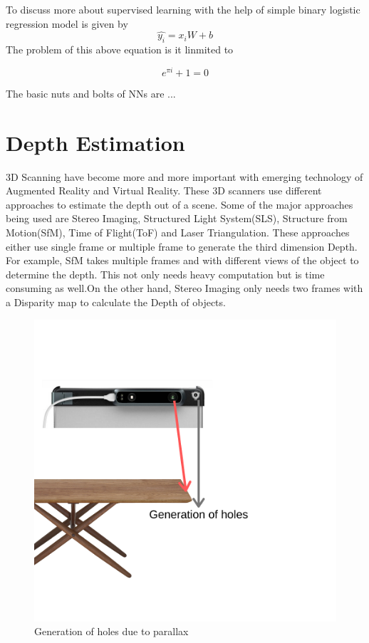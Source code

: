 To discuss more about supervised learning with the help of simple binary logistic regression model is given by
\begin{equation} \label{eq1}
    \hat{y_{i}} = x_{i}W + b 
\end{equation}
The problem of this above equation is it linmited to 


\begin{equation} \label{eq2}
    e^{\pi i} + 1 = 0
\end{equation}

The basic nuts and bolts of NNs are ...

\section{Depth Estimation}
3D Scanning have become more and more important with emerging technology of Augmented Reality and Virtual Reality. These 3D scanners use different approaches to estimate the depth out of a scene. Some of the major approaches being used are Stereo Imaging, Structured Light System(SLS), Structure from Motion(SfM), Time of Flight(ToF) and Laser Triangulation. These approaches either use single frame or multiple frame to generate the third dimension Depth. For example, SfM takes multiple frames and with different views of the object to determine the depth. This not only needs heavy computation but is time consuming as well.On the other hand, Stereo Imaging only needs two frames with a Disparity map to calculate the Depth of objects.\\

\begin{figure}[h]
    \centering
    \includegraphics[scale=0.4]{Figures/holes.png}
    \caption{Generation of holes due to parallax}
    \label{fig:holes}
\end{figure}


